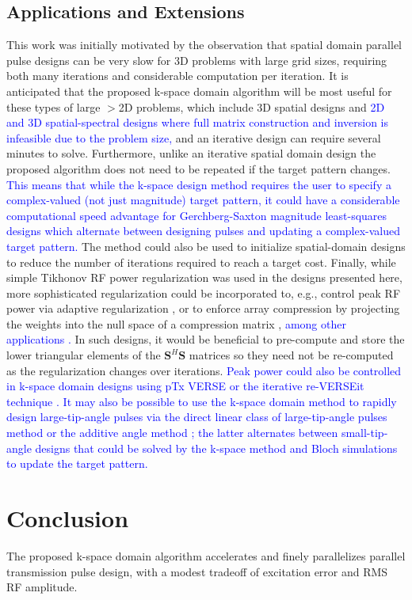 \subsection*{Applications and Extensions}
This work was initially motivated by the observation that spatial domain parallel pulse designs can be very slow
for 3D problems with large grid sizes, 
requiring both many iterations and considerable computation per iteration. 
It is anticipated that the proposed k-space domain algorithm will be most useful for these types of large $>$2D problems,
which include 3D spatial designs \cite{malik2012tailored,davids2016fast} and \textcolor{blue}{2D and 3D spatial-spectral designs \cite{stenger2000three,setsompop2009,Malik:2010aa,yang2010four}
where full matrix construction and inversion is infeasible due to the problem size, }
and an iterative design can require several minutes to solve. 
Furthermore, unlike an iterative spatial domain design the proposed algorithm does not need to be repeated if the target pattern changes.
\textcolor{blue}{This means that while the k-space design method requires the user to specify a complex-valued (not just magnitude) target pattern,
it could have a considerable computational speed advantage for Gerchberg-Saxton magnitude least-squares designs \cite{setsompop2008magnitude,malik:mrm:2015}
which alternate between designing pulses and updating a complex-valued target pattern. }
The method could also be used to initialize spatial-domain designs to reduce the number of iterations required to reach a target cost. 
Finally, while simple Tikhonov RF power regularization was used in the designs presented here,
more sophisticated regularization could be incorporated to, 
e.g., control peak RF power via adaptive regularization \cite{Yip:2005:Magn-Reson-Med:16155881},
or to enforce array compression by projecting the weights into the null space of a compression matrix \cite{cao2016array},
\textcolor{blue}{among other applications \cite{padormo:2016,deniz:2019}.} 
In such designs, it would be beneficial to pre-compute and store the lower triangular elements of the $\bm{S}^H\bm{S}$ matrices
so they need not be re-computed as the regularization changes over iterations.  
\textcolor{blue}{Peak power could also be controlled in k-space domain designs using pTx VERSE \cite{Lee:2011:MRM} or the iterative re-VERSEit technique \cite{lee2009tod}.} 
\textcolor{blue}{It may also be possible to use the k-space domain method to rapidly design large-tip-angle pulses via the direct linear class of large-tip-angle pulses method \cite{Xu:2008aa} or the additive angle method \cite{grissom:mrm:2008}; 
the latter alternates between small-tip-angle designs that could be solved by the k-space method and Bloch simulations to update the target pattern.} 


\section*{Conclusion}
The proposed k-space domain algorithm accelerates and finely parallelizes parallel transmission pulse design,
with a modest tradeoff of excitation error and RMS RF amplitude.